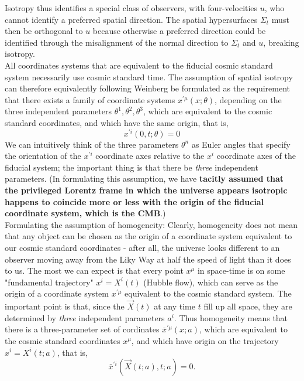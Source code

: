 	Isotropy thus identifies a special class of observers, with four-velocities
	$u$, who cannot identify a preferred spatial direction. The spatial hypersurfaces $\Sigma_t$ must then be orthogonal to $u$ because otherwise a preferred
	direction could be identified through the misalignment of the normal
	direction to $\Sigma_t$ and $u$, breaking isotropy.\\
	All coordinates systems that are equivalent to the fiducial cosmic standard system necessarily use cosmic standard time. The assumption of spatial isotropy can therefore equivalently following Weinberg be formulated as the requirement that there exists a family of coordinate systems $x^{\prime \mu}(x;\theta)$, depending on the three independent parameters $\theta^1,\theta^2,\theta^3$, which are equivalent to the cosmic standard coordinates, and which have the same origin, that is,
	\begin{equation}
		x^{\prime i}(0,t;\theta)=0
	\end{equation}
	We can intuitively think of the three parameters $\theta^n$ as Euler angles that specify the orientation of the $x^{\prime i}$ coordinate axes relative to the $x^i$ coordinate axes of the fiducial system; the important thing is that there be \emph{three} independent parameters. (In formulating this assumption, we have \textbf{tacitly assumed that the privileged Lorentz frame in which the universe appears isotropic happens to coincide more or less with the origin of the fiducial coordinate system, which is the CMB}.)
	\\
	Formulating the assumption of homogeneity: Clearly, homogeneity does not mean that any object can be chosen as the origin of a coordinate system equivalent to our cosmic standard coordinates -  after all, the universe looks different to an observer moving away from the Liky Way at half the speed of light than it does to us. The most we can expect is that every point $x^\mu$ in space-time is on some "fundamental  trajectory" $x^i=X^i(t)$ (Hubble flow), which can serve as the origin of a coordinate system $x^{\prime \mu}$ equivalent to the cosmic standard system. The important point is that, since the $\vec{X}(t)$ at any time $t$ fill up all space, they are determined by \emph{three} independent parameters $a^i$. Thus homogeneity means that there is a three-parameter set of cordinates $\bar{x}^{\prime \mu}(x;a)$, which are equivalent to the cosmic standard coordinates $x^\mu$, and which have origin on the trajectory $x^i=X^i(t;a)$, that is,
	\begin{equation}
		\bar{x}^{\prime i}(\vec{X}(t;a),t;a) =0.
	\end{equation}
